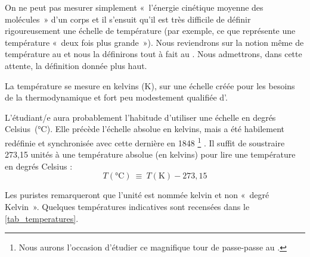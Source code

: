 		On ne peut pas mesurer simplement «~l’énergie cinétique moyenne des molécules~» d’un corps et il s'ensuit qu’il est très difficile de définir rigoureusement une échelle de température (par exemple, ce que représente une température «~deux fois plus grande~»). Nous reviendrons sur la notion même de température au \coursquatre et nous la définirons tout à fait au \courssept. Nous admettrons, dans cette attente, la définition donnée plus haut.

		La température se mesure en \si{kelvins} (\si{\kelvin}), sur une échelle créée pour les besoins de la thermodynamique et fort peu modestement qualifiée d’.

		L’étudiant/e aura probablement l’habitude d’utiliser une échelle en \si{degrés} \si{Celsius}~(\si{\degreeCelsius}). Elle précède l’échelle absolue en \si{kelvins}, mais a été habilement redéfinie et synchronisée avec cette dernière en 1848%
			\footnote{Nous aurons l’occasion d’étudier ce magnifique tour de passe-passe au \courssept.}%
		. Il suffit de soustraire 273,15 unités à une température absolue (en \si{kelvins}) pour lire une température en \si{degrés} \si{Celsius} :
		\begin{equation}
			T(\si{\degreeCelsius})\ \equiv \ T(\si{\kelvin}) - 273,15
			\label{def_température_kelvins_celsius}
		\end{equation}

		Les puristes remarqueront que l’unité est nommée \si{kelvin} et non «~degré Kelvin~». Quelques températures indicatives sont recensées dans le \cref{tab_temperatures}.

